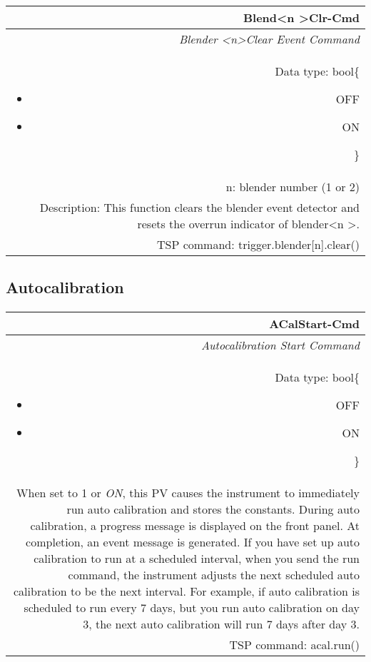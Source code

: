 \documentclass[openany]{article}
\begin{document}
		\begin{tabular}{N}
			\hline
			\bfseries Blend{\textless n \textgreater}Clr-Cmd\label{pv:blendclr-cmd} \\ \hline
			\emph{Blender \textless n\textgreater Clear Event Command} \\
			Data type: bool\{\begin{itemize}[noitemsep]
				\small
				\item[] OFF
				\item[] ON
			\end{itemize}\} \\
			n: blender number (1 or 2) \\
			Description: This function clears the blender event detector and resets the overrun indicator of blender\textless n \textgreater. \\
			TSP command: trigger.blender[n].clear()
		\end{tabular}

	\subsection{Autocalibration}\label{pvgroup:autocalibration}

		\paragraph{} %
		
		\begin{tabular}{N}
			\hline
			\bfseries ACalStart-Cmd\label{pv:acalstart-cmd} \\ \hline
			\emph{Autocalibration Start Command} \\
			Data type: bool\{\begin{itemize}[noitemsep]
				\small
				\item[] OFF
				\item[] ON
			\end{itemize}\} \\
			When set to 1 or \emph{ON}, this PV causes the instrument to immediately run auto calibration and stores the constants. During auto calibration, a progress message is displayed on the front panel. At completion, an event message is generated.
If you have set up auto calibration to run at a scheduled interval, when you send the run command, the instrument adjusts the next scheduled auto calibration to be the next interval. For example, if auto calibration is scheduled to run every 7 days, but you run auto calibration on day 3, the next auto calibration will run 7 days after day 3. \\
			TSP command: acal.run()
		\end{tabular}
\end{document}
